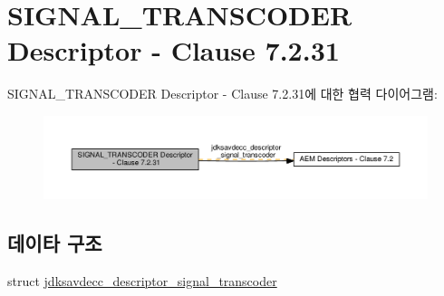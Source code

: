 \hypertarget{group__descriptor__transcoder}{}\section{S\+I\+G\+N\+A\+L\+\_\+\+T\+R\+A\+N\+S\+C\+O\+D\+ER Descriptor -\/ Clause 7.2.31}
\label{group__descriptor__transcoder}
S\+I\+G\+N\+A\+L\+\_\+\+T\+R\+A\+N\+S\+C\+O\+D\+ER Descriptor -\/ Clause 7.2.31에 대한 협력 다이어그램\+:
\nopagebreak
\begin{figure}[H]
\begin{center}
\leavevmode
\includegraphics[width=350pt]{group__descriptor__transcoder}
\end{center}
\end{figure}
\subsection*{데이타 구조}
\begin{DoxyCompactItemize}
\item 
struct \hyperlink{structjdksavdecc__descriptor__signal__transcoder}{jdksavdecc\+\_\+descriptor\+\_\+signal\+\_\+transcoder}
\end{DoxyCompactItemize}
